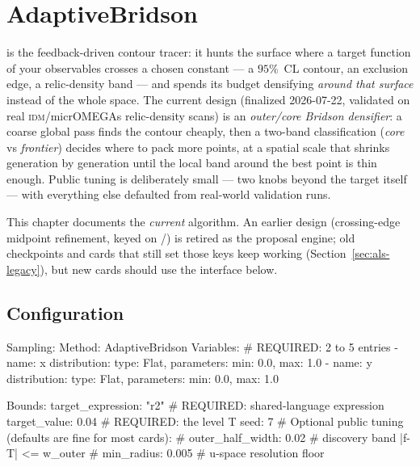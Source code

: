 \chapter{AdaptiveBridson}
\label{ch:adaptive-levelset}

  is the
feedback-driven contour tracer: it hunts the surface where a target function of your
observables crosses a chosen constant --- a $95\%$~CL contour, an exclusion edge, a
relic-density band --- and spends its budget densifying \emph{around that surface}
instead of the whole space. The current design (finalized 2026-07-22, validated on real
\textsc{idm}/micrOMEGAs relic-density scans) is an \emph{outer/core Bridson densifier}:
a coarse global pass finds the contour cheaply, then a two-band classification
(\emph{core} vs \emph{frontier}) decides where to pack more points, at a spatial scale
that shrinks generation by generation until the local band around the best point is
thin enough. Public tuning is deliberately small --- two knobs beyond the target itself
--- with everything else defaulted from real-world validation runs.

\begin{jnote}
This chapter documents the \emph{current} algorithm. An earlier design (crossing-edge
midpoint refinement, keyed on /)
is retired as the proposal engine; old checkpoints and cards that still set those keys
keep working (Section~\ref{sec:als-legacy}), but new cards should use the interface
below.
\end{jnote}

\section{Configuration}
\label{sec:als-config}

\begin{yamlwin}
Sampling:
  Method: AdaptiveBridson
  Variables:                        # REQUIRED: 2 to 5 entries
    - name: x
      distribution: { type: Flat, parameters: { min: 0.0, max: 1.0 } }
    - name: y
      distribution: { type: Flat, parameters: { min: 0.0, max: 1.0 } }

  Bounds:
    target_expression: "r2"         # REQUIRED: shared-language expression
    target_value: 0.04              # REQUIRED: the level T
    seed: 7
    # Optional public tuning (defaults are fine for most cards):
    # outer_half_width: 0.02        # discovery band |f-T| <= w_outer
    # min_radius: 0.005             # u-space resolution floor
\end{yamlwin}

